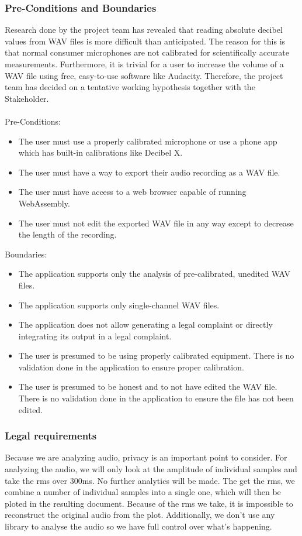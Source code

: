 \subsubsection{Pre-Conditions and Boundaries}\label{subsubsec:pre_conditions_and_boundaries}
Research done by the project team has revealed that reading absolute decibel values from WAV files is more difficult than anticipated.
The reason for this is that normal consumer microphones are not calibrated for scientifically accurate measurements\cite{stackoverflow_spl}. Furthermore, it is trivial for a user
to increase the volume of a WAV file using free, easy-to-use software like Audacity\cite{audacity,audacity_amplify}.
Therefore, the project team has decided on a tentative working hypothesis together with the Stakeholder. \\ \\
Pre-Conditions:
\begin{itemize}
    \item The user must use a properly calibrated microphone or use a phone app which has built-in calibrations like Decibel X\cite{decibelx_ios}\cite{decibelx_android}.
    \item The user must have a way to export their audio recording as a WAV file.
    \item The user must have access to a web browser capable of running WebAssembly.
    \item The user must not edit the exported WAV file in any way except to decrease the length of the recording.
\end{itemize}
Boundaries:
\begin{itemize}
    \item The application supports only the analysis of pre-calibrated, unedited WAV files.
    \item The application supports only single-channel WAV files.
    \item The application does not allow generating a legal complaint or directly integrating its output in a legal complaint.
    \item The user is presumed to be using properly calibrated equipment.
          There is no validation done in the application to ensure proper calibration.
    \item The user is presumed to be honest and to not have edited the WAV file.
          There is no validation done in the application to ensure the file has not been edited.
\end{itemize}

\subsubsection{Legal requirements}
Because we are analyzing audio, privacy is an important point to consider.
For analyzing the audio, we will only look at the amplitude of individual samples and take the rms over 300ms.
No further analytics will be made.
The get the rms, we combine a number of individual samples into a single one, which will then be ploted in the resulting document.
Because of the rms we take, it is impossible to reconstruct the original audio from the plot.
Additionally, we don't use any library to analyse the audio so we have full control over what's happening.

